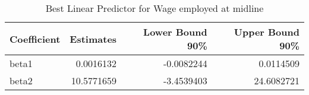 \begin{table}

\caption{\label{tab:blpRempl}Best Linear Predictor for Wage employed at midline}
\centering
\begin{tabular}[t]{lrrr}
\toprule
Coefficient & Estimates & Lower Bound 90\% & Upper Bound 90\%\\
\midrule
beta1 & 0.0016132 & -0.0082244 & 0.0114509\\
beta2 & 10.5771659 & -3.4539403 & 24.6082721\\
\bottomrule
\end{tabular}
\end{table}
